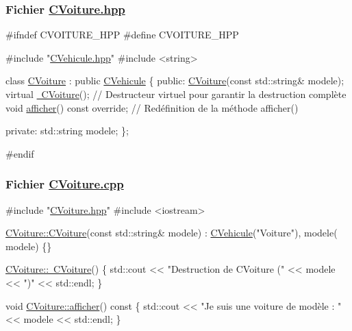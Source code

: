 \subsubsection*{Fichier {\ttfamily \hyperlink{CVoiture_8hpp}{C\+Voiture.\+hpp}}}


\begin{DoxyCode}
\textcolor{preprocessor}{#ifndef CVOITURE\_HPP}
\textcolor{preprocessor}{#define CVOITURE\_HPP}

\textcolor{preprocessor}{#include "\hyperlink{CVehicule_8hpp}{CVehicule.hpp}"}
\textcolor{preprocessor}{#include <string>}

\textcolor{keyword}{class }\hyperlink{classCVoiture}{CVoiture} : \textcolor{keyword}{public} \hyperlink{classCVehicule}{CVehicule} \{
\textcolor{keyword}{public}:
    \hyperlink{classCVoiture_ae37a64af5668827a9e7fd7c4e2251c04}{CVoiture}(\textcolor{keyword}{const} std::string& modele);
    \textcolor{keyword}{virtual} \hyperlink{classCVoiture_a35c99dadefbf269daba764cbe01488a1}{~CVoiture}(); \textcolor{comment}{// Destructeur virtuel pour garantir la destruction complète}
    \textcolor{keywordtype}{void} \hyperlink{classCVoiture_a0dd704fa1e172f461950f7f21a7ce21e}{afficher}() \textcolor{keyword}{const override}; \textcolor{comment}{// Redéfinition de la méthode afficher()}

\textcolor{keyword}{private}:
    std::string modele;
\};

\textcolor{preprocessor}{#endif}
\end{DoxyCode}


\subsubsection*{Fichier {\ttfamily \hyperlink{CVoiture_8cpp}{C\+Voiture.\+cpp}}}


\begin{DoxyCode}
\textcolor{preprocessor}{#include "\hyperlink{CVoiture_8hpp}{CVoiture.hpp}"}
\textcolor{preprocessor}{#include <iostream>}

\hyperlink{classCVoiture_ae37a64af5668827a9e7fd7c4e2251c04}{CVoiture::CVoiture}(\textcolor{keyword}{const} std::string& modele) : \hyperlink{classCVehicule}{CVehicule}(\textcolor{stringliteral}{"Voiture"}), modele(
      modele) \{\}

\hyperlink{classCVoiture_a35c99dadefbf269daba764cbe01488a1}{CVoiture::~CVoiture}() \{
    std::cout << \textcolor{stringliteral}{"Destruction de CVoiture ("} << modele << \textcolor{stringliteral}{")"} << std::endl;
\}

\textcolor{keywordtype}{void} \hyperlink{classCVoiture_a0dd704fa1e172f461950f7f21a7ce21e}{CVoiture::afficher}()\textcolor{keyword}{ const }\{
    std::cout << \textcolor{stringliteral}{"Je suis une voiture de modèle : "} << modele << std::endl;
\}
\end{DoxyCode}


